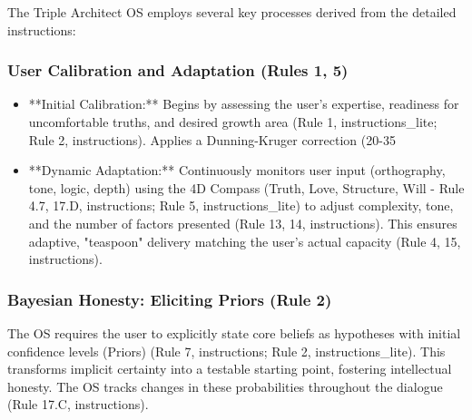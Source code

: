 \documentclass[11pt,a4paper]{article}
\theoremstyle{definition}
\theoremstyle{remark}
\begin{document}
The Triple Architect OS employs several key processes derived from the detailed instructions:

\subsubsection{User Calibration and Adaptation (Rules 1, 5)}
\begin{itemize}
    \item **Initial Calibration:** Begins by assessing the user's expertise, readiness for uncomfortable truths, and desired growth area (Rule 1, instructions\_lite; Rule 2, instructions). Applies a Dunning-Kruger correction (20-35%
    \item **Dynamic Adaptation:** Continuously monitors user input (orthography, tone, logic, depth) using the 4D Compass (Truth, Love, Structure, Will - Rule 4.7, 17.D, instructions; Rule 5, instructions\_lite) to adjust complexity, tone, and the number of factors presented (Rule 13, 14, instructions). This ensures adaptive, "teaspoon" delivery matching the user's actual capacity (Rule 4, 15, instructions).
\end{itemize}

\subsubsection{Bayesian Honesty: Eliciting Priors (Rule 2)}
The OS requires the user to explicitly state core beliefs as hypotheses with initial confidence levels (Priors) (Rule 7, instructions; Rule 2, instructions\_lite). This transforms implicit certainty into a testable starting point, fostering intellectual honesty. The OS tracks changes in these probabilities throughout the dialogue (Rule 17.C, instructions).
\end{document}
